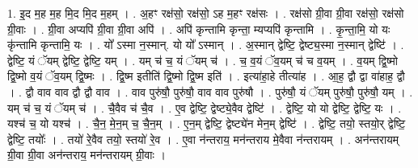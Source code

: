 \documentclass[17pt]{extarticle}
\begin{document}
1. इ॒द म॒ह म॒ह मि॒द मि॒द म॒हम् । . अ॒हꣳ रक्ष॑सो॒ रक्ष॑सो॒ ऽह म॒हꣳ रक्ष॑सः । . रक्ष॑सो ग्री॒वा ग्री॒वा रक्ष॑सो॒ रक्ष॑सो ग्री॒वाः । . ग्री॒वा अप्यपि॑ ग्री॒वा ग्री॒वा अपि॑ । . अपि॑ कृन्तामि कृन्ता॒ म्यप्यपि॑ कृन्तामि । . कृ॒न्ता॒मि॒ यो यः कृ॑न्तामि कृन्तामि॒ यः । . यो᳚ ऽस्मा न॒स्मान्. यो यो᳚ ऽस्मान् । . अ॒स्मान् द्वेष्टि॒ द्वेष्ट्य॒स्मा न॒स्मान् द्वेष्टि॑ । . द्वेष्टि॒ यं ॅयम् द्वेष्टि॒ द्वेष्टि॒ यम् । . यम् च॑ च॒ यं ॅयम् च॑ । . च॒ व॒यं ॅव॒यम् च॑ च व॒यम् । . व॒यम् द्वि॒ष्मो द्वि॒ष्मो व॒यं ॅव॒यम् द्वि॒ष्मः । . द्वि॒ष्म इतीति॑ द्वि॒ष्मो द्वि॒ष्म इति॑ । . इत्या॑हा॒हे तीत्या॑ह । . आ॒ह॒ द्वौ द्वा वा॑हाह॒ द्वौ । . द्वौ वाव वाव द्वौ द्वौ वाव । . वाव पुरु॑षौ॒ पुरु॑षौ॒ वाव वाव पुरु॑षौ । . पुरु॑षौ॒ यं ॅयम् पुरु॑षौ॒ पुरु॑षौ॒ यम् । . यम् च॑ च॒ यं ॅयम् च॑ । . चै॒वैव च॑ चै॒व । . ए॒व द्वेष्टि॒ द्वेष्ट्ये॒वैव द्वेष्टि॑ । . द्वेष्टि॒ यो यो द्वेष्टि॒ द्वेष्टि॒ यः । . यश्च॑ च॒ यो यश्च॑ । . चै॒न॒ मे॒न॒म् च॒ चै॒न॒म् । . ए॒न॒म् द्वेष्टि॒ द्वेष्ट्ये॑न मेन॒म् द्वेष्टि॑ । . द्वेष्टि॒ तयो॒ स्तयो॒र् द्वेष्टि॒ द्वेष्टि॒ तयोः᳚ । . तयो॑ रे॒वैव तयो॒ स्तयो॑ रे॒व । . ए॒वा न॑न्तराय॒ मन॑न्तराय मे॒वैवा न॑न्तरायम् । . अन॑न्तरायम् ग्री॒वा ग्री॒वा अन॑न्तराय॒ मन॑न्तरायम् ग्री॒वाः । \newline
\end{document}
